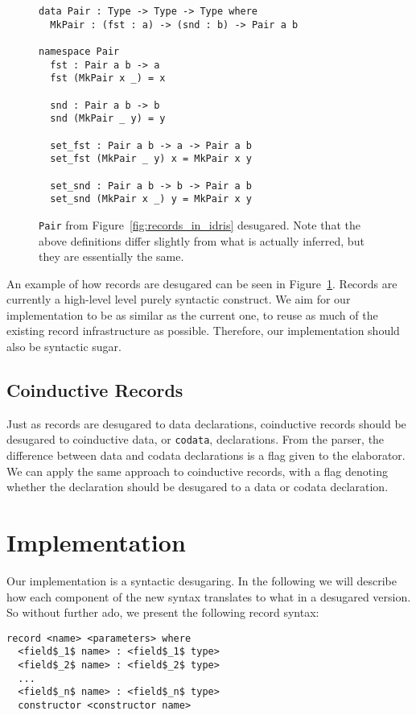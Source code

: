 \begin{figure}[h]
\begin{lstlisting}
data Pair : Type -> Type -> Type where
  MkPair : (fst : a) -> (snd : b) -> Pair a b

namespace Pair
  fst : Pair a b -> a
  fst (MkPair x _) = x

  snd : Pair a b -> b
  snd (MkPair _ y) = y

  set_fst : Pair a b -> a -> Pair a b
  set_fst (MkPair _ y) x = MkPair x y

  set_snd : Pair a b -> b -> Pair a b
  set_snd (MkPair x _) y = MkPair x y
\end{lstlisting}
  \caption{\texttt{Pair} from Figure~\ref{fig:records_in_idris} desugared. Note
    that the above definitions differ slightly from what is actually inferred,
    but they are essentially the same.}
  \label{fig:pair_desugared}
\end{figure}

An example of how records are desugared can be seen in
Figure~\ref{fig:pair_desugared}. Records are currently a high-level level
purely syntactic construct. We aim for our implementation to be as similar as
the current one, to reuse as much of the existing record infrastructure as
possible. Therefore, our implementation should also be syntactic sugar.

\subsection{Coinductive Records}
Just as records are desugared to data declarations, coinductive records should be
desugared to coinductive data, or \texttt{codata}, declarations. From the parser, the difference between data and
codata declarations is a flag given to the elaborator. We can apply the same
approach to coinductive records, with a flag denoting whether the declaration should be
desugared to a data or codata declaration. 

\section{Implementation}
Our implementation is a syntactic desugaring. In the following we will describe
how each component of the new syntax translates to what in a desugared
version. So without further ado, we present the following record syntax: 

\begin{lstlisting}[mathescape]
record <name> <parameters> where
  <field$_1$ name> : <field$_1$ type>
  <field$_2$ name> : <field$_2$ type>
  ...
  <field$_n$ name> : <field$_n$ type>
  constructor <constructor name>
\end{lstlisting}

